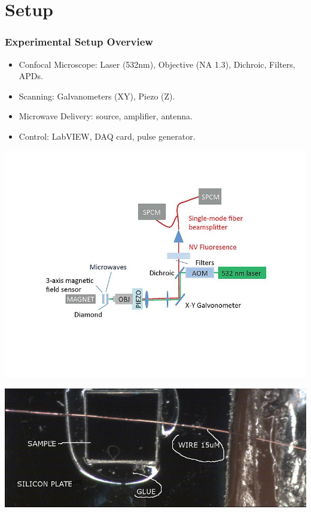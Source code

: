 \documentclass{beamer}
\begin{document}
\section{Setup}

\begin{frame}
\frametitle{Experimental Setup Overview}
\begin{itemize}
    \item Confocal Microscope: Laser (532nm), Objective (NA 1.3), Dichroic, Filters, APDs.
    \item Scanning: Galvanometers (XY), Piezo (Z).
    \item Microwave Delivery: source, amplifier, antenna. 
    \item Control: LabVIEW, DAQ card, pulse generator. 
\end{itemize}

    \begin{minipage}{0.48\textwidth}
        \centering
        \includegraphics[width=\linewidth]{presentation/figs/exptsetup.jpg}
   
    \end{minipage}
    \hfill
    \begin{minipage}{0.48\textwidth}
        \centering
        \includegraphics[width=\linewidth]{presentation/figs/sample.jpg}
       
    \end{minipage}

\end{frame}
\end{document}
